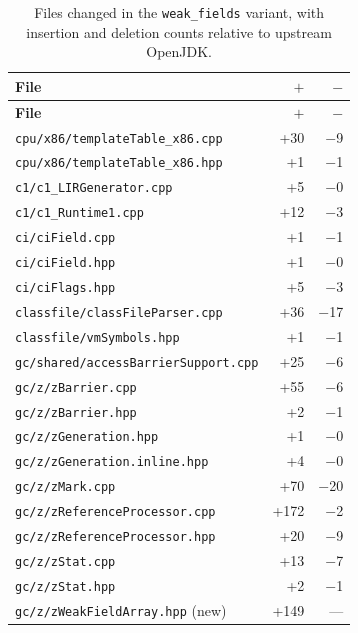 \begin{longtable}[c]{lrr}
\caption[File changes in \texttt{weak\_fields}]{Files changed in the \texttt{weak\_fields} variant, with insertion and deletion counts relative to upstream OpenJDK.} \label{tab:patch-weak-fields} \\
\toprule
\textbf{File} & \textbf{$+$} & \textbf{$-$} \\
\midrule
\endfirsthead
\toprule
\textbf{File} & \textbf{$+$} & \textbf{$-$} \\
\midrule
\endhead
\bottomrule
\endfoot
\texttt{cpu/x86/templateTable\_x86.cpp}         & +30  & $-$9  \\
\texttt{cpu/x86/templateTable\_x86.hpp}         & +1   & $-$1  \\
\texttt{c1/c1\_LIRGenerator.cpp}               & +5   & $-$0  \\
\texttt{c1/c1\_Runtime1.cpp}                   & +12  & $-$3  \\
\texttt{ci/ciField.cpp}                         & +1   & $-$1  \\
\texttt{ci/ciField.hpp}                         & +1   & $-$0  \\
\texttt{ci/ciFlags.hpp}                         & +5   & $-$3  \\
\texttt{classfile/classFileParser.cpp}          & +36  & $-$17 \\
\texttt{classfile/vmSymbols.hpp}                & +1   & $-$1  \\
\texttt{gc/shared/accessBarrierSupport.cpp}     & +25  & $-$6  \\
\texttt{gc/z/zBarrier.cpp}                      & +55  & $-$6  \\
\texttt{gc/z/zBarrier.hpp}                      & +2   & $-$1  \\
\texttt{gc/z/zGeneration.hpp}                   & +1   & $-$0  \\
\texttt{gc/z/zGeneration.inline.hpp}            & +4   & $-$0  \\
\texttt{gc/z/zMark.cpp}                         & +70  & $-$20 \\
\texttt{gc/z/zReferenceProcessor.cpp}           & +172 & $-$2  \\
\texttt{gc/z/zReferenceProcessor.hpp}           & +20  & $-$9  \\
\texttt{gc/z/zStat.cpp}                         & +13  & $-$7  \\
\texttt{gc/z/zStat.hpp}                         & +2   & $-$1  \\
\texttt{gc/z/zWeakFieldArray.hpp} (new)         & +149 & ---   \\

\end{longtable}
